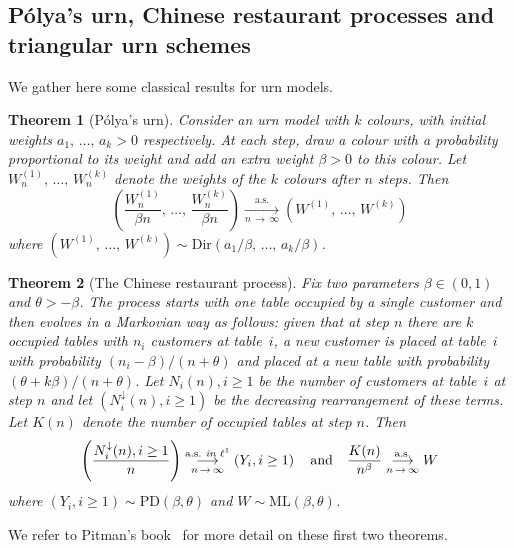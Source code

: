 \documentclass[10pt]{amsart}
\newtheorem{theo}{Theorem}[section]
\theoremstyle{definition}\newtheorem{defi}[theo]{Definition}\newtheorem{rema}[theo]{Remark}\newtheorem{exam}[theo]{Example}\newtheorem{exem}[theo]{Example}\newtheorem{nota}[theo]{Notation}
\newcommand{\ML}{\mathrm{ML}}
\newcommand{\PD}{\mathrm{PD}}
\newcommand{\Dir}{\mathrm{Dir}}
\begin{document}
\subsection{P\'olya's urn, Chinese restaurant processes and triangular urn schemes} \label{sec:urnproof}

We gather here some classical results for urn models.

\begin{theo}[P{\'o}lya's urn]\label{thm:urn2}
Consider an urn model with $k$ colours, with initial weights $a_1,\,\ldots,\,a_k>0$ respectively. At each step, draw a colour with a probability proportional to its weight and add an extra weight $\beta>0$ to this colour. Let $W^{(1)}_n,\,\ldots,\,W^{(k)}_n$ denote the weights of the $k$ colours after $n$ steps. Then
\[
\left(\frac{W^{(1)}_n}{\beta n},\,\ldots,\,\frac{W^{(k)}_n}{\beta n}\right) \underset{n \,\rightarrow\,\infty}{\overset{\text{a.s.}}\longrightarrow} \left(W^{(1)},\,\ldots,\,W^{(k)}\right)
\]
where $(W^{(1)},\,\ldots,\,W^{(k)}) \sim \Dir(a_1/\beta,\,\ldots,\,a_k/\beta)$.
\end{theo}


\begin{theo}[The Chinese restaurant process]\label{thm:urn3}
Fix two parameters $\beta \in (0,1)$ and $\theta>-\beta$. The process starts with one table occupied by a single customer and then evolves in a Markovian way as follows: given that at step $n$ there are $k$ occupied tables with $n_i$ customers at table~$i$, a new customer is placed at table~$i$ with probability $(n_i-\beta)/(n+\theta)$ and placed at a new table with probability $(\theta+k\beta)/(n+\theta)$. Let $N_i(n),i\geq 1$ be the number of customers at table~$i$ at step $n$ and let $(N^{\downarrow}_i(n),i\geq 1)$ be the decreasing rearrangement of these terms. Let $K(n)$ denote the number of occupied tables at step $n$. Then
\[
\left(\frac{N^{\downarrow}_i(n),i \geq 1}{n}\right) \underset{n\,\rightarrow\,\infty}{\overset{\text{a.s.} \text{\emph{ in} }\ell^1}\longrightarrow} \left(Y_i,i\geq 1\right) \quad \text{and}\quad \frac{K(n)}{n^{\beta} } \underset{n \,\rightarrow\,\infty}{\overset{\text{a.s.}}\longrightarrow} W
\]
where $(Y_i,i\geq 1) \sim \PD(\beta,\theta)$ and $W \sim \ML(\beta,\theta)$.
\end{theo}

We refer to Pitman's book~\cite[Chapter~3]{PitmanStFl} for more detail on these first two theorems.
\end{document}
